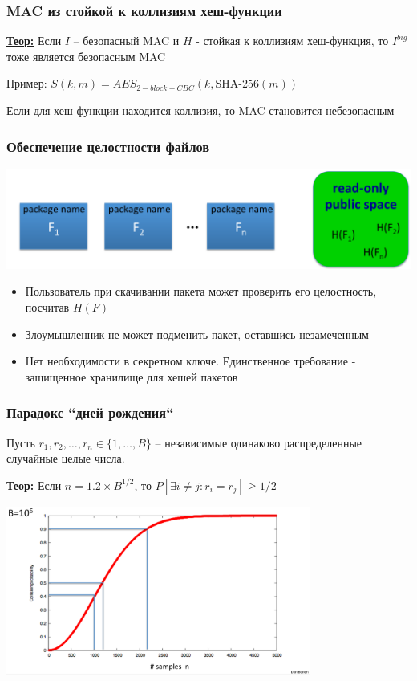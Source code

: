 \documentclass{beamer}
\newcommand{\theorema}[1]{{\textbf{\underline{Теор:}} #1}}
\newcommand{\set}[1]{{\lbrace #1 \rbrace}}
\begin{document}
\begin{frame}
  \frametitle{MAC из стойкой к коллизиям хеш-функции}

  \theorema{Если $I$ -- безопасный MAC и $H$ - стойкая к коллизиям хеш-функция, то
            $I^{big}$ тоже является безопасным MAC}

  \vspace{10mm}

  Пример:  $S(k,m) = AES_{2-block-CBC}(k, \text{SHA-256}(m))$

  \vspace{8mm}
  Если для хеш-функции находится коллизия, то MAC становится небезопасным
\end{frame}

\begin{frame}
  \frametitle{Обеспечение целостности файлов}

  \includegraphics[width=\linewidth]{./images/png/CR_hash_packages.png}
  \begin{itemize}
    \item{Пользователь при скачивании пакета может проверить его целостность, посчитав $H(F)$}
    \item{Злоумышленник не может подменить пакет, оставшись незамеченным}
    \item{Нет необходимости в секретном ключе. Единственное требование - защищенное хранилище для хешей пакетов}
  \end{itemize}
\end{frame}

\begin{frame}
  \frametitle{Парадокс ``дней рождения``}

  Пусть $r_1, r_2, \ldots, r_n \in \set{1,\ldots,B}$ -- независимые одинаково распределенные случайные целые числа.

  \vspace{4mm}
  \theorema{Если $n=1.2 \times B^{1/2}$, то $P[ \exists i \neq j: r_i = r_j ] \geq 1/2$}

  \vspace{4mm}
  \includegraphics[width=100mm]{./images/png/birthday_paradox.png}
\end{frame}
\end{document}
